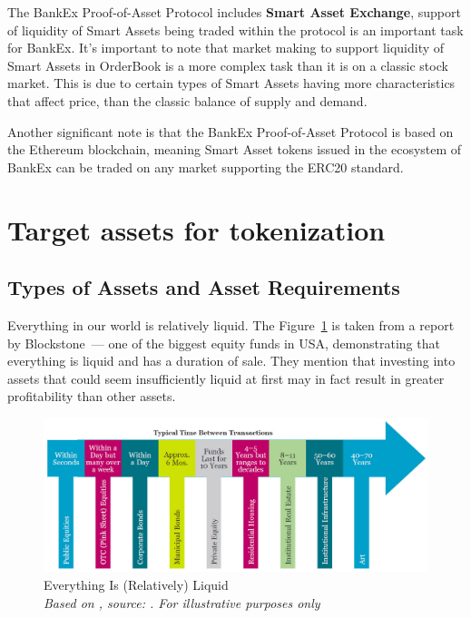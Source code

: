 \documentclass{article}
\begin{document}
\begin{multicols}{2}
The BankEx Proof-of-Asset Protocol includes \textbf{Smart Asset Exchange}, support of liquidity of Smart Assets being traded within the protocol is an important task for BankEx. It’s important to note that market making to support liquidity of Smart Assets in OrderBook is a more complex task than it is on a classic stock market. This is due to certain types of Smart Assets having more characteristics that affect price, than the classic balance of supply and demand. 

Another significant note is that the BankEx Proof-of-Asset Protocol is based on the Ethereum blockchain, meaning Smart Asset tokens issued in the ecosystem of BankEx can be traded on any market supporting the ERC20 standard.

\section{Target assets for tokenization}

\subsection{Types of Assets and Asset Requirements}

Everything in our world is relatively liquid. The Figure~\ref{fig:blackstone} is taken from a report \cite{blackstone2015} by Blockstone~--- one of the biggest equity funds in USA, demonstrating that everything is liquid and has a duration of sale. They mention that investing into assets that could seem insufficiently liquid at first may in fact result in greater profitability than other assets.

\begin{figure}
  \centering
  \includegraphics[width=\textwidth]{blackstone.png}
  \caption{Everything Is (Relatively) Liquid\\\textit{Based on \cite{blackstone2015}, source: \cite{ilmanen2011expected}. For illustrative purposes only}}
  \label{fig:blackstone}
\end{figure}


\end{multicols}
\end{document}
